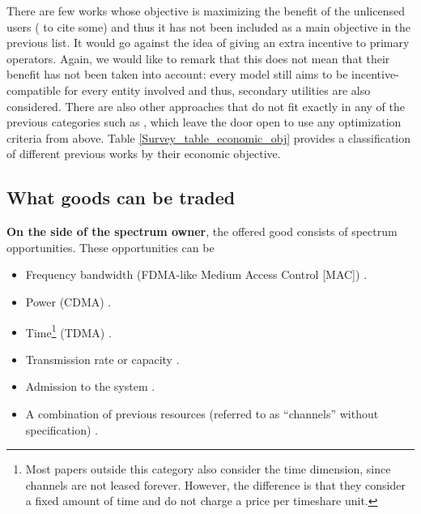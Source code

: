 There are few works whose objective is maximizing the benefit of the unlicensed users (\cite{ref:Niyato2007_Game,ref:Illeri2005,ref:Niyato2009_Dyn} to cite some) and thus it has not been included as a main objective in the previous list. It would go against the idea of giving an extra incentive to primary operators. Again, we would like to remark that this does not mean that their benefit has not been taken into account: every model still aims to be incentive-compatible for every entity involved and thus, secondary utilities are also considered. There are also other approaches that do not fit exactly in any of the previous categories such as \cite{ref:Illeri2005,ref:Zhou2008}, which leave the door open to use any optimization criteria from above. Table \ref{Survey_table_economic_obj} provides a classification of different previous works by their economic objective.



\subsection{What goods can be traded}
\label{subsec:What}
\textbf{On the side of the spectrum owner}, the offered good consists of spectrum opportunities. These opportunities can be
\begin{itemize}
\item Frequency bandwidth (FDMA-like Medium Access Control [MAC]) \cite{ref:Niyato2007_Game,ref:Niyato2008_Comp,ref:Duan2010_Cog,ref:Duan2010_Comp,ref:Zhu2012_Dyn,ref:Xu2010,ref:Sengupta2007,ref:Sengupta2009,ref:Niyato2008_Mark,ref:Niyato2010,ref:Wang2010_Spec}. 
\item Power (CDMA) \cite{ref:Wang2008,ref:Yu2010,ref:Gao2011,ref:Huang2006,ref:Jayaweera2009,ref:Jayaweera2010,ref:Vazquez2010}.
\item Time\footnote{Most papers outside this category also consider the time dimension, since channels are not leased forever. However, the difference is that they consider a fixed amount of time and do not charge a price per timeshare unit.} (TDMA)  \cite{ref:Xu2011,ref:Simeone2008,ref:Zhang2009,ref:Li2011,ref:Duan2011_Contract,ref:Niyato2007_Eq}.
\item Transmission rate or capacity \cite{ref:Illeri2005,ref:Jia2008_com,ref:Maille2009} .
\item Admission to the system \cite{ref:Kaskebar2012,ref:Mutlu2008,ref:Yang2011}.
\item A combination of previous resources (referred to as ``channels'' without specification) \cite{ref:Xu2012,ref:Zhou2008,ref:Zhu2012,ref:Xing2007,ref:Jia2009_Rev,ref:Niyato2009_Dyn,ref:Niyato2007_Hier,ref:Gao2011_MAP,ref:Zhou2009_TRUST}. 
\end{itemize}

